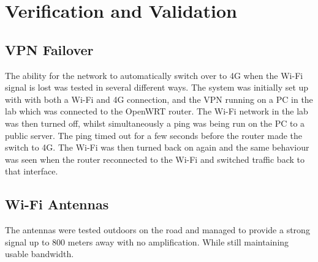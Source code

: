 \section{Verification and Validation}

\subsection{VPN Failover}
The ability for the network to automatically switch over to 4G when the Wi-Fi signal is lost was tested in several different ways.
\newline
The system was initially set up with with both a Wi-Fi and 4G connection, and the VPN running on a PC in the lab which was connected to the OpenWRT router.
\newline
The Wi-Fi network in the lab was then turned off, whilst simultaneously a ping was being run on the PC to a public server. The ping timed out for a few seconds before the router made the switch to 4G. The Wi-Fi was then turned back on again and the same behaviour was seen when the router reconnected to the Wi-Fi and switched traffic back to that interface.

\subsection{Wi-Fi Antennas}
The antennas were tested outdoors on the road and managed to provide a strong signal up to 800 meters away with no amplification. While still maintaining usable bandwidth.
